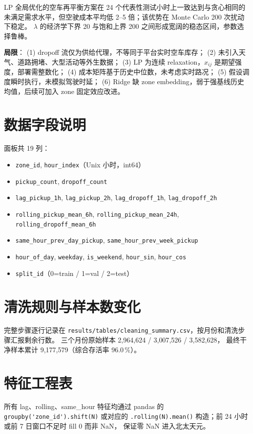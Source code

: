 \documentclass[12pt,a4paper]{article}
\begin{document}
LP 全局优化的空车再平衡方案在 24 个代表性测试小时上一致达到与贪心相同的
未满足需求水平，但空驶成本平均低 2--5 倍；该优势在 Monte Carlo 200 次扰动下稳定。
$\lambda$ 的经济学下界 20 与饱和上界 200 之间形成宽阔的稳态区间，参数选择鲁棒。

\textbf{局限}：
(1) dropoff 流仅为供给代理，不等同于平台实时空车库存；
(2) 未引入天气、道路拥堵、大型活动等外生数据；
(3) LP 为连续 relaxation，$x_{ij}$ 是期望强度，部署需整数化；
(4) 成本矩阵基于历史中位数，未考虑实时路况；
(5) 假设调度瞬时执行，未模拟驾驶时延；
(6) Ridge 缺 zone embedding，弱于强基线历史均值，后续可加入 zone 固定效应改进。

\appendix
\vspace{0.5em}

\section{数据字段说明}\label{app:data-fields}
面板共 19 列：
\begin{itemize}\small
\item \verb|zone_id|, \verb|hour_index|（Unix 小时，int64）
\item \verb|pickup_count|, \verb|dropoff_count|
\item \verb|lag_pickup_1h|, \verb|lag_pickup_2h|, \verb|lag_dropoff_1h|, \verb|lag_dropoff_2h|
\item \verb|rolling_pickup_mean_6h|, \verb|rolling_pickup_mean_24h|, \verb|rolling_dropoff_mean_6h|
\item \verb|same_hour_prev_day_pickup|, \verb|same_hour_prev_week_pickup|
\item \verb|hour_of_day|, \verb|weekday|, \verb|is_weekend|, \verb|hour_sin|, \verb|hour_cos|
\item \verb|split_id|（0=train / 1=val / 2=test）
\end{itemize}

\section{清洗规则与样本数变化}\label{app:cleaning}
完整步骤逐行记录在 \verb|results/tables/cleaning_summary.csv|，按月份和清洗步骤汇报剩余行数。
三个月份原始样本 2{,}964{,}624 / 3{,}007{,}526 / 3{,}582{,}628，
最终干净样本累计 9{,}177{,}579（综合存活率 96.0\,\%）。

\section{特征工程表}\label{app:feature-engineering}
所有 lag、rolling、same\_hour 特征均通过 pandas 的
\verb|groupby('zone_id').shift(N)|
或对应的 \verb|.rolling(N).mean()|
构造；前 24 小时或前 7 日窗口不足时 fill 0 而非 NaN，
保证零 NaN 进入北太天元。
\end{document}
